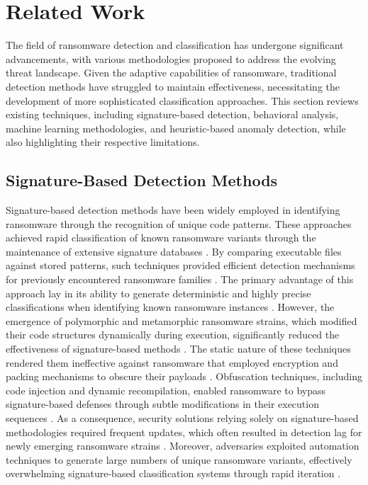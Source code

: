 \section{Related Work}
The field of ransomware detection and classification has undergone significant advancements, with various methodologies proposed to address the evolving threat landscape. Given the adaptive capabilities of ransomware, traditional detection methods have struggled to maintain effectiveness, necessitating the development of more sophisticated classification approaches. This section reviews existing techniques, including signature-based detection, behavioral analysis, machine learning methodologies, and heuristic-based anomaly detection, while also highlighting their respective limitations.

\subsection{Signature-Based Detection Methods}

Signature-based detection methods have been widely employed in identifying ransomware through the recognition of unique code patterns. These approaches achieved rapid classification of known ransomware variants through the maintenance of extensive signature databases \cite{burck2024ransomware}. By comparing executable files against stored patterns, such techniques provided efficient detection mechanisms for previously encountered ransomware families \cite{loco2024adaptive}. The primary advantage of this approach lay in its ability to generate deterministic and highly precise classifications when identifying known ransomware instances \cite{anticore2024neural}. However, the emergence of polymorphic and metamorphic ransomware strains, which modified their code structures dynamically during execution, significantly reduced the effectiveness of signature-based methods \cite{hamill2024detecting}. The static nature of these techniques rendered them ineffective against ransomware that employed encryption and packing mechanisms to obscure their payloads \cite{neweva2024forensic}. Obfuscation techniques, including code injection and dynamic recompilation, enabled ransomware to bypass signature-based defenses through subtle modifications in their execution sequences \cite{shanks2024innovative}. As a consequence, security solutions relying solely on signature-based methodologies required frequent updates, which often resulted in detection lag for newly emerging ransomware strains \cite{totham2024dynamic}. Moreover, adversaries exploited automation techniques to generate large numbers of unique ransomware variants, effectively overwhelming signature-based classification systems through rapid iteration \cite{kayess2024novel}.

